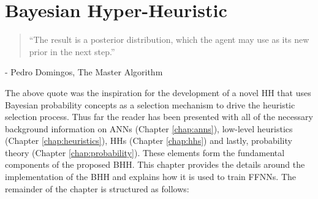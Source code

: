 \chapter{Bayesian Hyper-Heuristic}\label{chap:bhh}

\begin{quotation}
      ``The result is a posterior distribution, which the agent may use as its new prior in the next step.''
\end{quotation}
\begin{flushright}
      - Pedro Domingos, The Master Algorithm
\end{flushright}

The above quote was the inspiration for the development of a novel \acf{HH} that uses Bayesian probability concepts as a selection mechanism to drive the heuristic selection process. Thus far the reader has been presented with all of the necessary background information on \acp{ANN} (Chapter \ref{chap:anns}), low-level heuristics (Chapter \ref{chap:heuristics}), \acp{HH} (Chapter \ref{chap:hhs}) and lastly, probability theory (Chapter \ref{chap:probability}). These elements form the fundamental components of the proposed \Acf{BHH}. This chapter provides the details around the implementation of the \Ac{BHH} and explains how it is used to train \acp{FFNN}. The remainder of the chapter is structured as follows:

